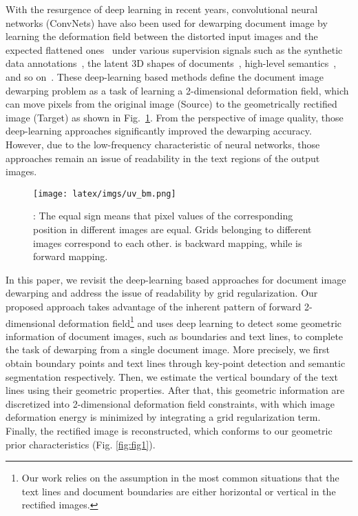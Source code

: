 \documentclass[10pt,twocolumn,letterpaper]{article}
\begin{document}
With the resurgence of deep learning in recent years, convolutional neural networks (ConvNets) have also been used for dewarping document image by learning the deformation field between the distorted input images and the expected flattened ones~\cite{Ma_2018_CVPR,Das_2019_ICCV,li2019document,CEARSE,xie2020dewarping,das2021end} under various supervision signals such as the synthetic data annotations~\cite{Ma_2018_CVPR}, the latent 3D shapes of documents~\cite{Das_2019_ICCV}, high-level semantics~\cite{CEARSE}, and so on~\cite{xie2020dewarping,das2021end}. 
These deep-learning based methods define the document image dewarping problem as a task of learning a 2-dimensional deformation field, which can move pixels from the original image  (Source) to the geometrically rectified image  (Target) as shown in Fig.~\ref{fig:DS}.
From the perspective of image quality, those deep-learning approaches significantly improved the dewarping accuracy. However, due to the low-frequency characteristic of neural networks, those approaches remain an issue of readability in the text regions of the output images. 


\begin{figure}[!t]
  \centering
\texttt{[image: latex/imgs/uv\_bm.png]}

   \caption{: The equal sign means that pixel values of the corresponding position in different images are equal. Grids belonging to different images correspond to each other.  is backward mapping, while  is forward mapping.}
   \label{fig:DS}
   \vspace{1em}
\end{figure}



In this paper, we revisit the deep-learning based approaches for document image dewarping and address the issue of readability by grid regularization.
Our proposed approach takes advantage of the inherent pattern of forward 2-dimensional deformation field\footnote{Our work relies on the assumption in the most common situations that the text lines and document boundaries are either horizontal or vertical in the rectified images.} and uses deep learning to detect some geometric information of document images, such as boundaries and text lines, to complete the task of dewarping from a single document image. 
More precisely, we first obtain boundary points and text lines through key-point detection and semantic segmentation respectively. Then, we estimate the vertical boundary of the text lines using their geometric properties. After that, this geometric information are discretized into 2-dimensional deformation field constraints, with which image deformation energy is minimized by integrating a grid regularization term. Finally, the rectified image is reconstructed, which conforms to our geometric prior characteristics (Fig. \ref{fig:fig1}). 
\end{document}
